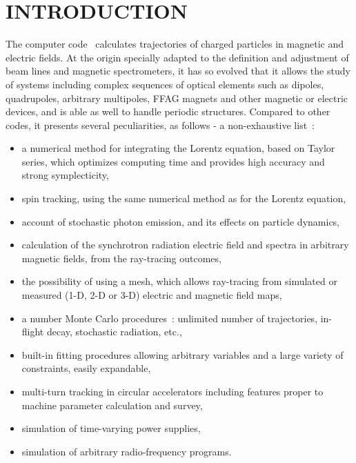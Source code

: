 \newpage
\clearemptydoublepage

\section*{INTRODUCTION} 

The computer code \zgou\  calculates trajectories of
charged particles in magnetic and electric fields.  At the origin specially adapted to the definition and adjustment of 
beam lines and magnetic spectrometers, it has so evolved that it allows the study of systems including complex
 sequences of optical elements such as dipoles, quadrupoles, 
 arbitrary multipoles, FFAG magnets and other magnetic or electric
 devices, and is able as well to handle periodic structures.  Compared to other codes, 
it presents several peculiarities, as follows - a non-exhaustive list~: 
\begin{itemize}
\item a numerical method for integrating the Lorentz equation, based on Taylor series,
	which optimizes computing time and provides high accuracy and strong symplecticity,
\item spin tracking, using the same numerical method as for the Lorentz equation,
\item account of stochastic photon emission, and its effects on particle dynamics, 
\item calculation of the synchrotron radiation electric field and 
spectra in arbitrary magnetic fields, from the ray-tracing outcomes,
\item the possibility of using a mesh, which allows ray-tracing from
	simulated or measured (1-D, 2-D or 3-D) electric and magnetic field maps, 
\item a number  Monte Carlo procedures~: unlimited number of trajectories, in-flight decay, 
stochastic radiation, etc., 
\item built-in fitting procedures allowing arbitrary variables and a large variety of 
constraints, easily expandable, 
\item multi-turn tracking in circular accelerators including  features proper to machine 
parameter calculation and survey,  
\item simulation of time-varying power  supplies, 
\item simulation of arbitrary radio-frequency programs.
\end{itemize}

\medskip

